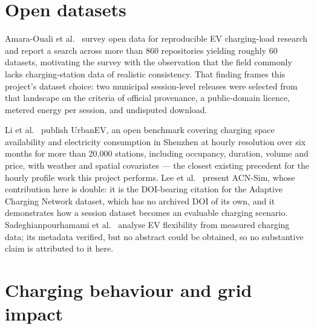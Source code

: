 \documentclass[11pt,a4paper]{article}
\begin{document}
\section{Open datasets}\label{sec:datasets}

Amara-Ouali et al.~\cite{AmaraOuali2021EVLoadOpenDataReview} survey open data for reproducible EV
charging-load research and report a search across more than 860 repositories yielding roughly
60 datasets, motivating the survey with the observation that the field commonly lacks
charging-station data of realistic consistency. That finding frames this project's dataset choice:
two municipal session-level releases were selected from that landscape on the criteria of official
provenance, a public-domain licence, metered energy per session, and undisputed download.

Li et al.~\cite{Li2025UrbanEV} publish UrbanEV, an open benchmark covering charging space
availability and electricity consumption in Shenzhen at hourly resolution over six months for more
than 20{,}000 stations, including occupancy, duration, volume and price, with weather and spatial
covariates --- the closest existing precedent for the hourly profile work this project performs.
Lee et al.~\cite{Lee2021ACNSim} present ACN-Sim, whose contribution here is double: it is the
DOI-bearing citation for the Adaptive Charging Network dataset, which has no archived DOI of its own,
and it demonstrates how a session dataset becomes an evaluable charging scenario.
Sadeghianpourhamami et al.~\cite{Sadeghianpourhamami2018EVFlexibility} analyse EV flexibility from
measured charging data; its metadata verified, but no abstract could be obtained, so no substantive
claim is attributed to it here.

\section{Charging behaviour and grid impact}\label{sec:impact}
\end{document}
